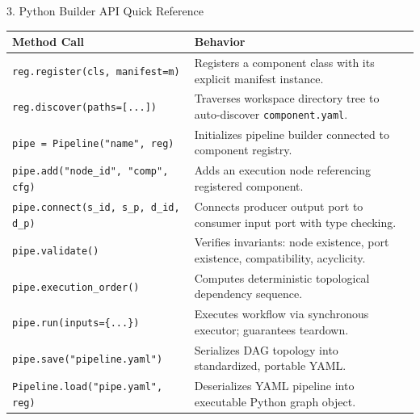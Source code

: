 \documentclass[11pt,a4paper]{article}
\begin{document}
\begin{cheatsheetcard}{3. Python Builder API Quick Reference}
\small
\begin{tabularx}{\linewidth}{p{5.5cm} X}
\textbf{Method Call} & \textbf{Behavior} \\
\midrule
\texttt{reg.register(cls, manifest=m)} & Registers a component class with its explicit manifest instance. \\
\texttt{reg.discover(paths=[...])} & Traverses workspace directory tree to auto-discover \texttt{component.yaml}. \\
\texttt{pipe = Pipeline("name", reg)} & Initializes pipeline builder connected to component registry. \\
\texttt{pipe.add("node\_id", "comp", cfg)} & Adds an execution node referencing registered component. \\
\texttt{pipe.connect(s\_id, s\_p, d\_id, d\_p)} & Connects producer output port to consumer input port with type checking. \\
\texttt{pipe.validate()} & Verifies invariants: node existence, port existence, compatibility, acyclicity. \\
\texttt{pipe.execution\_order()} & Computes deterministic topological dependency sequence. \\
\texttt{pipe.run(inputs=\{...\})} & Executes workflow via synchronous executor; guarantees teardown. \\
\texttt{pipe.save("pipeline.yaml")} & Serializes DAG topology into standardized, portable YAML. \\
\texttt{Pipeline.load("pipe.yaml", reg)} & Deserializes YAML pipeline into executable Python graph object. \\
\end{tabularx}
\end{cheatsheetcard}

\vspace{6pt}
\end{document}
